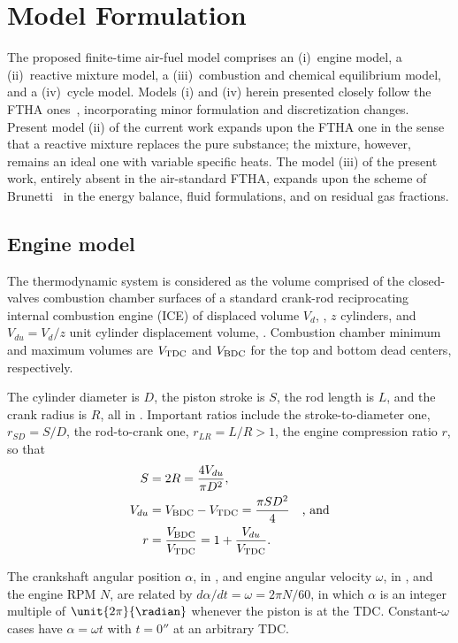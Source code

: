 \section{Model Formulation}

    The proposed finite-time air-fuel model comprises an (i)~engine model, a (ii)~reactive mixture model, a (iii)~combustion and
    chemical equilibrium model, and a  (iv)~cycle  model.  Models  (i)  and  (iv)  herein  presented  closely  follow  the  FTHA
    ones~\cite{2017-NaaktgeborenC-IntJMechEngEduc}, incorporating minor formulation and discretization  changes.  Present  model
    (ii) of the current work expands upon the FTHA one in the sense that a reactive mixture replaces  the  pure  substance;  the
    mixture, however, remains an ideal one with variable specific heats. The model (iii) of the present work, entirely absent in
    the air-standard FTHA, expands upon the scheme  of  Brunetti~\cite{2012-BrunettiF-Blucher}  in  the  energy  balance,  fluid
    formulations, and on residual gas fractions.


    \subsection{Engine model}\label{sec:model.engine}

    The thermodynamic system is considered as the volume comprised  of  the  closed-valves  combustion  chamber  surfaces  of  a
    standard crank-rod reciprocating internal combustion engine (ICE) of displaced volume $V_d$,  \meter\cubed,  $z$  cylinders,
    and $V_{du} = V_d / z$ unit cylinder displacement volume, \meter\cubed. Combustion chamber minimum and maximum  volumes  are
    $V_{\mbox{\scriptsize TDC}}$ and $V_{\mbox{\scriptsize BDC}}$ for the top and bottom dead centers, respectively.

    The cylinder diameter is $D$, the piston stroke is $S$, the rod length is $L$, and the crank radius is $R$, all  in  \meter.
    Important ratios include the stroke-to-diameter one, $r_{SD} = S/D$, the rod-to-crank one, $r_{LR} = L/R >  1$,  the  engine
    compression ratio $r$, so that%
    \begin{align}
        \label{eq:S}
        S       &= 2 R = \frac{4 V_{du}}{\pi D^{2}}, \\
        \label{eq:Vdu}
        V_{du}  &= V_{\mbox{\scriptsize BDC}} - V_{\mbox{\scriptsize TDC}} = \frac{\pi SD^2}{4}\quad\mbox{, and} \\
        \label{eq:r}
        r       &= \frac{V_{\mbox{\scriptsize BDC}}}{V_{\mbox{\scriptsize TDC}}} = 1 + \frac{V_{du}}{V_{\mbox{\scriptsize TDC}}}.
    \end{align}

    The crankshaft angular position $\alpha$, in \radian, and engine angular velocity $\omega$, in \radian\per\second,  and  the
    engine RPM $N$, are related  by  $d\alpha/dt  =  \omega  =  2\pi  N/60$,  in  which  $\alpha$  is  an  integer  multiple  of
    $\unit{2\pi}{\radian}$ whenever the piston is at the TDC. Constant-$\omega$ cases  have  $\alpha  =  \omega  t$  with  $t  =
    \unit{0}{\second}$ at an arbitrary TDC.




